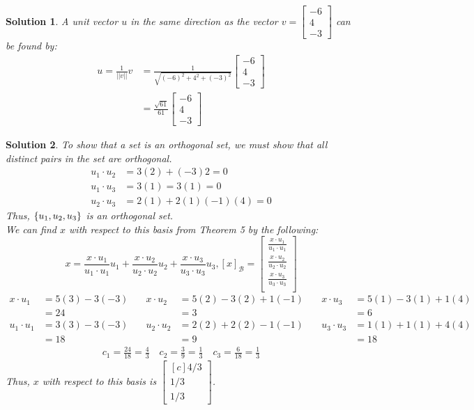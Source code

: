\documentclass[11pt]{scrartcl}
\theoremstyle{dotlessP}
\newtheorem{sol}{Solution}[section]
\theoremstyle{dotlessN}
\DeclarePairedDelimiter\set{\{}{\}}
\newcommand{\basis}{\mathcal{B}}
\begin{document}
\begin{sol}
	A unit vector $u$ in the same direction as the vector $v =
\begin{bmatrix}
	-6 \\
	4 \\
	-3
\end{bmatrix}
	$ can be found by:
	\begin{align*}
		u = \frac{1}{||v||}v &= \frac{1}{\sqrt{(-6)^2 + 4^2 + (-3)^2}}
		\begin{bmatrix}
			-6 \\
			4 \\
			-3
		\end{bmatrix} \\
							 &= \frac{\sqrt{61}}{61}
							 \begin{bmatrix}
							 	-6 \\
								4 \\
								-3
							 \end{bmatrix}
	\end{align*}
\end{sol}
\begin{sol}
	To show that a set is an orthogonal set, we must show that all distinct pairs in the set are orthogonal.
	\begin{align*}
		u_1 \cdot u_2 &= 3(2) + (-3)2 = 0 \\
		u_1 \cdot u_3 &= 3(1) = 3(1) = 0 \\
		u_2 \cdot u_3 &= 2(1) + 2(1) (-1)(4) = 0
	\end{align*}
	Thus, $\set*{u_1, u_2, u_3}$ is an orthogonal set.
	\\

	We can find $x$ with respect to this basis from Theorem 5 by the following:
\[
	x = \frac{x\cdot u_1}{u_1 \cdot u_1}u_1 + \frac{x\cdot u_2}{u_2 \cdot u_2}u_2 +\frac{x\cdot u_3}{u_3 \cdot u_3}u_3, [x]_\basis = 
	\begin{bmatrix}
		\frac{x\cdot u_1}{u_1 \cdot u_1} \\
		\frac{x\cdot u_2}{u_2 \cdot u_2} \\
		\frac{x\cdot u_3}{u_3 \cdot u_3} \\
	\end{bmatrix}
\] 
	\begin{align*}
		x \cdot u_1 &= 5(3) -3(-3) &\quad x \cdot u_2 &= 5(2) - 3(2) + 1(-1) &\quad x \cdot u_3 &= 5(1) - 3(1) + 1(4) \\
					&= 24 &\quad &= 3 &\quad &=6 \\
		u_1\cdot u_1 &= 3(3) -3(-3) &\quad u_2 \cdot u_2 &= 2(2) + 2(2) -1(-1) &\quad u_3 \cdot u_3 &= 1(1) + 1(1) + 4(4) \\
					 &= 18 &\quad &= 9 &\quad &= 18
	\end{align*}
	\begin{align*}
		c_1 = \frac{24}{18} = \frac{4}{3} \quad c_2 = \frac{3}{9} = \frac{1}{3} \quad c_3 = \frac{6}{18} = \frac{1}{3}
	\end{align*}
	Thus, $x$ with respect to this basis is $
	\begin{bmatrix}[c]
	4/3 \\
	1/3 \\
	1/3
\end{bmatrix}
	$.
\end{sol}
\end{document}
